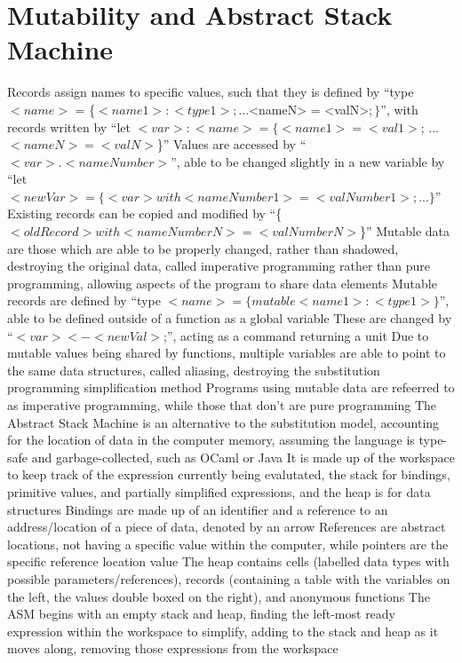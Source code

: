 \documentclass[11 pt, twoside]{article}
\newenvironment{outline*}
{
	\begin{outline}[enumerate]
	}
	{\end{outline}
}
\begin{document}
\section{Mutability and Abstract Stack Machine}
\begin{outline*}
\1 Records assign names to specific values, such that they is defined by ``type $<name>$ = \{$<name1>:<type1>; ...$<nameN> = <valN>$;\}$'', with records written by ``let $<var>: <name> = \{<name1> = <val1>$; ...$<nameN> = <valN>$\}''
	\2 Values are accessed by ``$<var>.<nameNumber>$'', able to be changed slightly in a new variable by ``let $<newVar> = \{<var> with <nameNumber1>=<valNumber1>; ...\}$''
	\2 Existing records can be copied and modified by ``\{$<oldRecord> with <nameNumberN> = <valNumberN>$\}''
\1 Mutable data are those which are able to be properly changed, rather than shadowed, destroying the original data, called imperative programming rather than pure programming, allowing aspects of the program to share data elements
	\2 Mutable records are defined by ``type $<name> = \{mutable <name1> : <type1>\}$'', able to be defined outside of a function as a global variable
	\2 These are changed by ``$<var> <- <newVal>$;'', acting as a command returning a unit
	\2 Due to mutable values being shared by functions, multiple variables are able to point to the same data structures, called aliasing, destroying the substitution programming simplification method
	\2 Programs using mutable data are refeerred to as imperative programming, while those that don't are pure programming
\1 The Abstract Stack Machine is an alternative to the substitution model, accounting for the location of data in the computer memory, assuming the language is type-safe and garbage-collected, such as OCaml or Java
	\2 It is made up of the workspace to keep track of the expression currently being evalutated, the stack for bindings, primitive values, and partially simplified expressions, and the heap is for data structures
		\3 Bindings are made up of an identifier and a reference to an address/location of a piece of data, denoted by an arrow
			\4 References are abstract locations, not having a specific value within the computer, while pointers are the specific reference location value
		\3 The heap contains cells (labelled data types with possible parameters/references), records (containing a table with the variables on the left, the values double boxed on the right), and anonymous functions
	\2 The ASM begins with an empty stack and heap, finding the left-most ready expression within the workspace to simplify, adding to the stack and heap as it moves along, removing those expressions from the workspace

\end{outline*}
\end{document}
